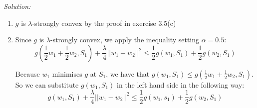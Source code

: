 \documentclass[
10pt, %
a4paper, %
oneside, %
headinclude,footinclude, %
BCOR5mm, %
]{scrartcl}
\newenvironment{solution}
               {\textit{Solution:}}
               {}
\begin{document}
\begin{solution}
  \begin{enumerate}
    \item $g$ is $\lambda$-strongly convex by the proof in exercise 3.5(c)
    \item Since $g$ is $\lambda$-strongly convex, we apply the inequality setting $\alpha=0.5$: \[g(\frac{1}{2} w_1 + \frac{1}{2}w_2, S_1) + \frac{\lambda}{4}||w_1-w_2||^2 \leq \frac{1}{2} g(w_1, S_1) + \frac{1}{2}g(w_2, S_1)\]

      Because $w_1$ minimises $g$ at $S_1$, we have that $g(w_1, S_1) \leq g(\frac{1}{2} w_1 + \frac{1}{2} w_2, S_1)$. So we can substitute $g(w_1, S_1)$ in the left hand side in the following way: \[g(w_1, S_1) + \frac{\lambda}{4}||w_1-w_2||^2 \leq \frac{1}{2}g(w_1, s_1) + \frac{1}{2}g(w_2, S_1)\]


\end{enumerate}
\end{solution}
\end{document}
